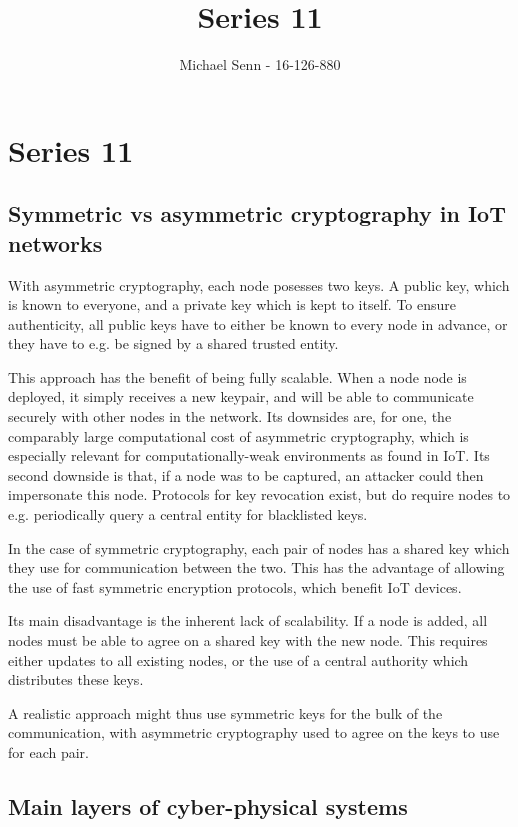 \documentclass[a4paper]{scrreprt}
\title{Series 11}
\author{Michael Senn \maillink{michael.senn@students.unibe.ch} - 16-126-880}
\date{\printdate}
\begin{document}
\maketitle


\setcounter{chapter}{10}

\chapter{Series 11}

\section{Symmetric vs asymmetric cryptography in IoT networks}

With asymmetric cryptography, each node posesses two keys. A public key, which
is known to everyone, and a private key which is kept to itself. To ensure
authenticity, all public keys have to either be known to every node in advance,
or they have to e.g. be signed by a shared trusted entity.

This approach has the benefit of being fully scalable. When a node node is
deployed, it simply receives a new keypair, and will be able to communicate
securely with other nodes in the network. Its downsides are, for one, the
comparably large computational cost of asymmetric cryptography, which is
especially relevant for computationally-weak environments as found in IoT. Its
second downside is that, if a node was to be captured, an attacker could then
impersonate this node. Protocols for key revocation exist, but do require nodes
to e.g. periodically query a central entity for blacklisted keys.

In the case of symmetric cryptography, each pair of nodes has a shared key
which they use for communication between the two. This has the advantage of
allowing the use of fast symmetric encryption protocols, which benefit IoT
devices.

Its main disadvantage is the inherent lack of scalability. If a node is added,
all nodes must be able to agree on a shared key with the new node. This
requires either updates to all existing nodes, or the use of a central
authority which distributes these keys.

A realistic approach might thus use symmetric keys for the bulk of the
communication, with asymmetric cryptography used to agree on the keys to use
for each pair.

\section{Main layers of cyber-physical systems}
\end{document}
